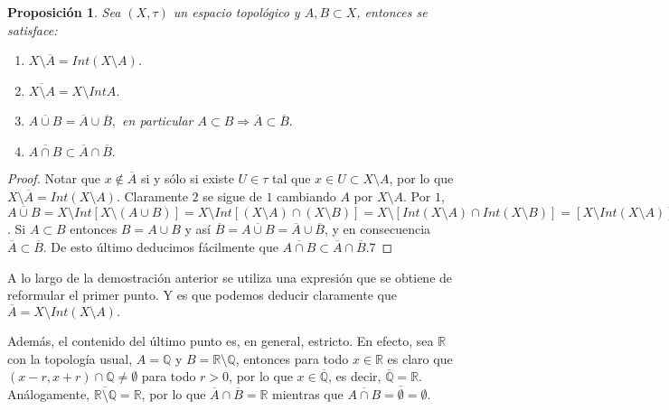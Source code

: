 \documentclass[12pt]{article}
\newtheorem{proposition}[theorem]{Proposición}
\begin{document}
\begin{proposition}Sea $(X, \tau)$ un espacio topológico y $A,B \subset X$, entonces se satisface: \begin{enumerate}
\item $X \setminus \overline{A} = Int(X\setminus A)$.
\item $\overline{X\setminus A} = X \setminus Int A$.
\item $\overline{A \cup B} = \overline{A} \cup \overline{B},$ en particular $A \subset B \Rightarrow \overline{A} \subset \overline{B}.$
\item $\overline{A \cap B} \subset \overline{A} \cap \overline{B}.$
\end{enumerate}
\end{proposition}
\begin{proof}
Notar que $x \notin \overline{A}$ si y sólo si existe $U \in \tau$ tal que $x \in U \subset X \setminus A$, por lo que $X \setminus \overline{A} = Int (X \setminus A)$. Claramente $2$ se sigue de $1$ cambiando $A$ por $X\setminus A$. Por $1$, $\overline{A \cup B} = X \setminus Int[X \setminus (A \cup B)] = X \setminus Int[(X\setminus A)\cap (X\setminus B)] = X \setminus [Int(X \setminus A) \cap Int(X \setminus B)] = [X \setminus Int(X\setminus A) ]\cup [X \setminus Int(X\setminus B)] = \overline{A} \cup \overline{B}$. Si $A \subset B$ entonces $B = A \cup B$ y así $\overline{B} = \overline{A \cup B} = \overline{A} \cup \overline{B}$, y en consecuencia $\overline{A} \subset \overline{B}$. De esto último deducimos fácilmente que $\overline{A \cap B} \subset \overline{A} \cap \overline{B}$.7

\end{proof}

A lo largo de la demostración anterior se utiliza una expresión que se obtiene de reformular el primer punto. Y es que podemos deducir claramente que $\overline{A} = X \setminus Int(X\setminus A).$

Además, el contenido del último punto es, en general, estricto. En efecto, sea $\mathbb{R}$ con la topología usual, $A = \mathbb{Q}$ y $B = \mathbb{R} \setminus \mathbb{Q}$, entonces para todo $x \in \mathbb{R}$ es claro que $(x-r, x+r) \cap \mathbb{Q} \neq \emptyset$ para todo $r >0$, por lo que $x \in \overline{\mathbb{Q}}$, es decir, $\overline{\mathbb{Q}} = \mathbb{R}.$ Análogamente, $\overline{\mathbb{R} \setminus \mathbb{Q}} = \mathbb{R}$, por lo que $\overline{A} \cap \overline{B} = \mathbb{R}$ mientras que $\overline{A \cap B} = \overline{\emptyset} = \emptyset.$
\end{document}
